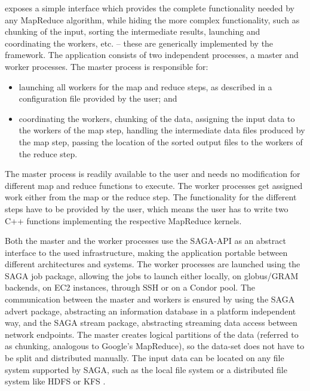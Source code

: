 \documentclass[3p,twocolumn]{elsarticle}
\begin{document}

\smr exposes a simple interface which provides the complete
functionality needed by any MapReduce algorithm, while hiding the more
complex functionality, such as chunking of the input, sorting the
intermediate results, launching and coordinating the workers, etc. --
these are generically implemented by the framework.  The application
consists of two independent processes, a master and worker processes.
The master process is responsible for:

\begin{itemize}

 \item launching all workers for the map and reduce steps, as
 described in a configuration file provided by the user; and

 \item coordinating the workers, chunking of the data, assigning the
 input data to the workers of the map step, handling the intermediate
 data files produced by the map step, passing the location of the
 sorted output files to the workers of the reduce step.  


\end{itemize}

The master process is readily available to the user and needs no
modification for different map and reduce functions to execute.  The
worker processes get assigned work either from the map or the reduce
step. The functionality for the different steps have to be provided by
the user, which means the user has to write two C++ functions
implementing the respective MapReduce kernels.

Both the master and the worker processes use the SAGA-API as an
abstract interface to the used infrastructure, making the application
portable between different architectures and systems.  The worker
processes are launched using the SAGA job package, allowing the jobs
to launch either locally, on globus/GRAM backends, on EC2 instances, through SSH
or on a Condor pool. The communication between the master and workers
is ensured by using the SAGA advert package, abstracting an
information database in a platform independent way, and the SAGA stream
package, abstracting streaming data access between network endpoints.
The master creates logical partitions of the data (referred to as chunking,
analogous to Google's MapReduce), so the data-set does not have to be split
and distributed manually.  The input data can be located on any file system
supported by SAGA, such as the local file system or a distributed file system
like HDFS or KFS \cite{KFS}.
\end{document}
